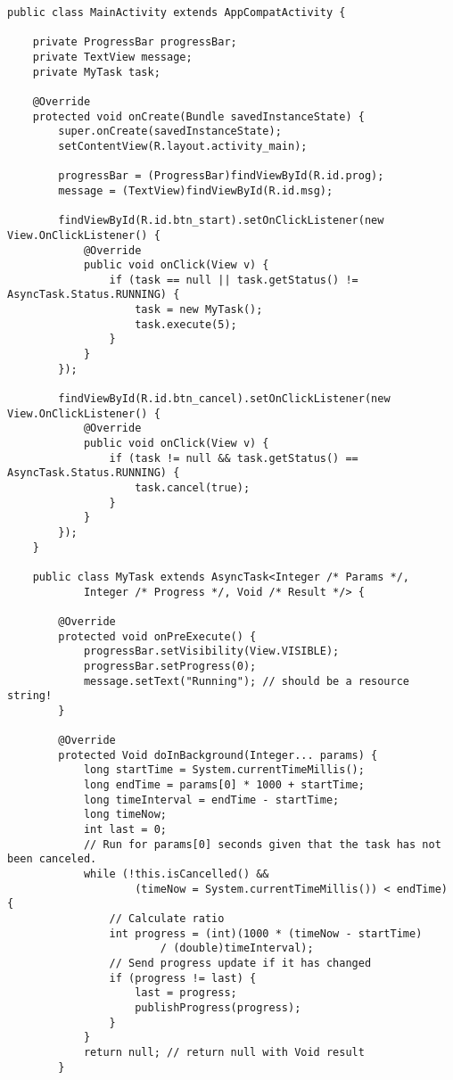 \begin{lstlisting}[style=A_Java, caption={Background task done with asynchronous task}, label={listing:asyncprog}]
public class MainActivity extends AppCompatActivity {

    private ProgressBar progressBar;
    private TextView message;
    private MyTask task;

    @Override
    protected void onCreate(Bundle savedInstanceState) {
        super.onCreate(savedInstanceState);
        setContentView(R.layout.activity_main);

        progressBar = (ProgressBar)findViewById(R.id.prog);
        message = (TextView)findViewById(R.id.msg);

        findViewById(R.id.btn_start).setOnClickListener(new View.OnClickListener() {
            @Override
            public void onClick(View v) {
                if (task == null || task.getStatus() != AsyncTask.Status.RUNNING) {
                    task = new MyTask();
                    task.execute(5);
                }
            }
        });

        findViewById(R.id.btn_cancel).setOnClickListener(new View.OnClickListener() {
            @Override
            public void onClick(View v) {
                if (task != null && task.getStatus() == AsyncTask.Status.RUNNING) {
                    task.cancel(true);
                }
            }
        });
    }

    public class MyTask extends AsyncTask<Integer /* Params */, 
            Integer /* Progress */, Void /* Result */> {
            
        @Override
        protected void onPreExecute() {
            progressBar.setVisibility(View.VISIBLE);
            progressBar.setProgress(0);
            message.setText("Running"); // should be a resource string!
        }
        
        @Override
        protected Void doInBackground(Integer... params) {
            long startTime = System.currentTimeMillis();
            long endTime = params[0] * 1000 + startTime;
            long timeInterval = endTime - startTime;
            long timeNow;
            int last = 0;
            // Run for params[0] seconds given that the task has not been canceled.
            while (!this.isCancelled() && 
                    (timeNow = System.currentTimeMillis()) < endTime) {
                // Calculate ratio
                int progress = (int)(1000 * (timeNow - startTime) 
                        / (double)timeInterval);
                // Send progress update if it has changed
                if (progress != last) {
                    last = progress;
                    publishProgress(progress);
                }
            }
            return null; // return null with Void result
        }


\end{lstlisting}
